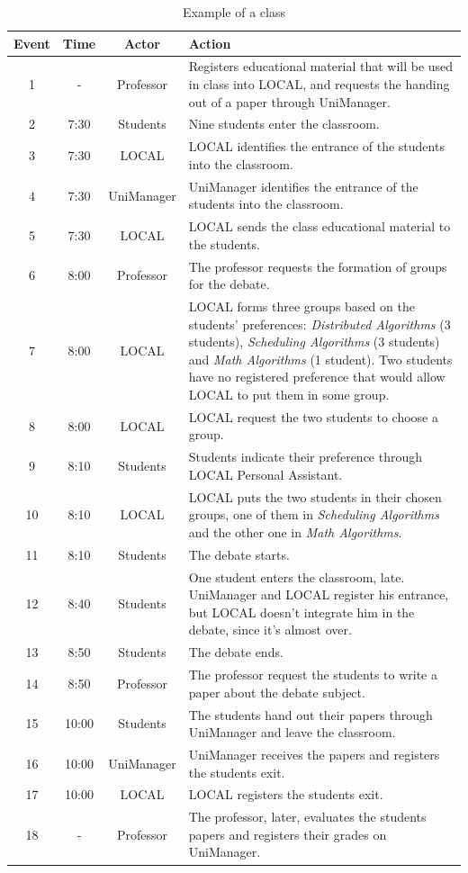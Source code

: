 \documentclass[preprint,authoryear,12pt,dvipdfm]{elsarticle}
\begin{document}
\begin{table}\centering\footnotesize
    \begin{tabular*}{1\textwidth}{@{}cccp{6.8cm}@{}}
    \toprule
    Event & Time & Actor & Action \\
    \midrule
    1 & - & Professor & Registers educational material that will be used in
class into LOCAL, and requests the handing out of a paper through UniManager. \\
    2 & 7:30 & Students & Nine students enter the classroom. \\
    3 & 7:30 & LOCAL & LOCAL identifies the entrance of the students into the classroom. \\
    4 & 7:30 & UniManager & UniManager identifies the entrance of the students into the classroom. \\
    5 & 7:30 & LOCAL & LOCAL sends the class educational material to the students. \\
    6 & 8:00 & Professor & The professor requests the formation of groups for the debate. \\
    7 & 8:00 & LOCAL & LOCAL forms three groups based on the students' preferences: {\em Distributed Algorithms} (3 students), {\em Scheduling Algorithms} (3 students) and {\em Math Algorithms} (1 student). Two students have no registered preference that would allow LOCAL to put them in some group. \\
    8 & 8:00 & LOCAL & LOCAL request the two students to choose a group. \\
    9 & 8:10 & Students & Students indicate their preference through LOCAL Personal Assistant. \\
    10 & 8:10 & LOCAL & LOCAL puts the two students in their chosen groups, one of them in {\em Scheduling Algorithms} and the other one in {\em Math Algorithms}. \\
    11 & 8:10 & Students & The debate starts. \\
    12 & 8:40 & Students & One student enters the classroom, late. UniManager and LOCAL register his entrance, but LOCAL doesn't integrate him in the debate, since it's almost over.\\
    13 & 8:50 & Students & The debate ends. \\
    14 & 8:50 & Professor & The professor request the students to write a paper about the debate subject.\\
    15 & 10:00 & Students & The students hand out their papers through UniManager and leave the classroom.\\
    16 & 10:00 & UniManager & UniManager receives the papers and registers the students exit.\\
    17 & 10:00 & LOCAL & LOCAL registers the students exit.\\
    18 & - & Professor & The professor, later, evaluates the students papers and registers their grades on UniManager.\\
    \bottomrule
  \end{tabular*}
  \caption{Example of a class}
  \label{tab:aula}
\end{table}
\end{document}
